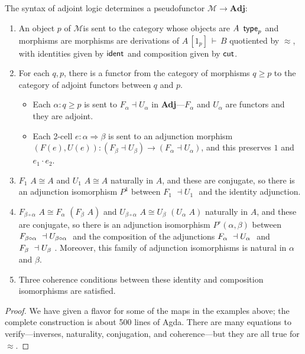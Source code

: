 \documentclass{drl-common/llncs}
\newcommand{\M}{\ensuremath{\mathcal{M}}}
\newcommand{\la}{\ensuremath{\dashv}}
\newcommand{\tc}[2]{\ensuremath{#1 \Rightarrow #2}}
\newcommand{\Adj}{\textbf{Adj}}
\newcommand\compo[2]{\ensuremath{#1 \circ #2}}
\newcommand\compv[2]{\ensuremath{#1 \cdot #2}}
\renewcommand\wftp[2]{\ensuremath{#1 \,\,\, \dsd{type}_{#2}}}
\newcommand\F[2]{\ensuremath{F_{#1} \,\, #2}}
\newcommand\U[2]{\ensuremath{U_{#1} \,\, #2}}
\newcommand\seq[3]{\ensuremath{#1 \, [ #2 ] \, \vdash \, #3}}
\newcommand\ident[1]{\ensuremath{\dsd{ident}_{#1}}}
\newcommand\cutsym{\ensuremath{\dsd{cut}}}
\newcommand\ap[2]{\ensuremath{#1 \approx #2}}
\newcommand\iso{\cong}
\begin{document}
\begin{theorem} \label{thm:syntacticpseudofunctor}
The syntax of adjoint logic determines a pseudofunctor $\M \to \Adj$:
\begin{enumerate}
\item An object $p$ of \M is sent to the category whose objects are
  \wftp{A}{p} and morphisms are morphisms are derivations of
  \seq{A}{1_p}{B} quotiented by $\ap{}{}$, with identities given by
  \ident{} and composition given by \cutsym.

\item For each $q,p$, there is a functor from the category of morphisms
  $q \ge p$ to the category of adjoint functors between $q$ and $p$.
  \begin{itemize}
  \item 
  Each $\alpha : q \ge p$ is sent to $F_\alpha \la U_\alpha$ in
  \Adj---$F_\alpha$ and $U_\alpha$ are functors and they are adjoint.

  \item Each 2-cell $e : \tc{\alpha}{\beta}$ is sent to an adjunction
    morphism $(F(e),U(e)) : (F_\beta \la U_\beta) \to (F_\alpha \la
    U_\alpha)$, and this preserves $1$ and $\compv{e_1}{e_2}$.
  \end{itemize}

\item $\F 1 A \iso A$ and $\U 1 A \iso A$ naturally in $A$, and these
  are conjugate, so there is an adjunction isomorphism $P^1$ between $\F 1 {}
  \la \U 1 {}$ and the identity adjunction.

\item $\F {\compo{\beta}{\alpha}} A \iso \F \alpha {(\F \beta A)}$ and
  $\U {\compo{\beta}{\alpha}} A \iso \U \beta {(\U \alpha A)}$ naturally
  in $A$, and these are conjugate, so there is an adjunction isomorphism
  $P^{\circ}(\alpha,\beta)$ between $\F {\compo{\beta}{\alpha}} \la \U
  {\compo{\beta}{\alpha}}$ and the composition of the adjunctions $\F
  {\alpha} \la \U {\alpha}$ and $\F {\beta} \la \U {\beta}$.  Moreover,
  this family of adjunction isomorphisms is natural in $\alpha$ and
  $\beta$.

\item Three coherence conditions between these identity and composition
  isomorphisms are satisfied.
\end{enumerate}
\end{theorem}

\begin{proof}
We have given a flavor for some of the maps in the examples above; the
complete construction is about 500 lines of Agda.  There are many
equations to verify---inverses, naturality, conjugation, and
coherence---but they are all true for \ap{}{}.
\end{proof}
\end{document}
